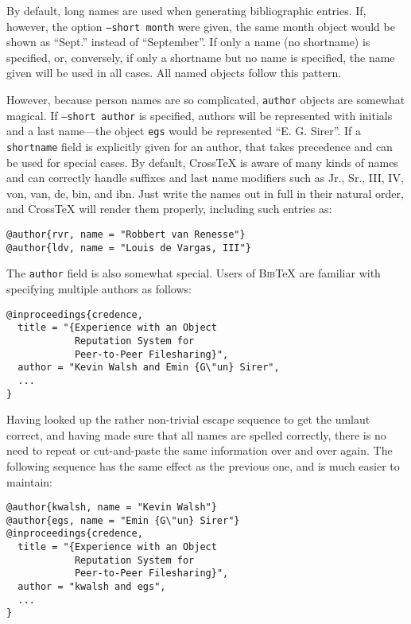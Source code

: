 \documentclass{article}
\newcommand{\XTeX}{Cross\TeX}
\newcommand{\BibTeX}{\textsc{Bib}\TeX}
\begin{document}
By default, long names are used when generating bibliographic entries. If, however, the option \texttt{--short month} were given, the same month object would be shown as ``Sept.'' instead of ``September''. If only a name (no shortname) is specified, or, conversely, if only a shortname but no name is specified, the name given will be used in all cases. All named objects follow this pattern.

However, because person names are so complicated, \texttt{author} objects are somewhat magical. If \texttt{--short author} is specified, authors will be represented with initials and a last name---the object \texttt{egs} would be represented ``E. G. Sirer''. If a \texttt{shortname} field is explicitly given for an author, that takes precedence and can be used for special cases. 
By default, \XTeX{} is aware of many kinds of names and can correctly handle suffixes and last name modifiers such as Jr., Sr., III, IV, von, van, de, bin, and ibn. Just write the names out in full in their natural order, and \XTeX{} will render them properly, including such entries as:

\begin{small}\begin{verbatim}
@author{rvr, name = "Robbert van Renesse"}
@author{ldv, name = "Louis de Vargas, III"}
\end{verbatim}\end{small}

The \texttt{author} field is also somewhat special. Users of \BibTeX{} are familiar with specifying multiple authors as follows:

\begin{small}\begin{verbatim}
@inproceedings{credence,
  title = "{Experience with an Object
            Reputation System for 
            Peer-to-Peer Filesharing}",
  author = "Kevin Walsh and Emin {G\"un} Sirer",
  ...
}
\end{verbatim}\end{small}

Having looked up the rather non-trivial escape sequence to get the umlaut 
correct, and having made sure that all names are spelled correctly, there
is no need to repeat or cut-and-paste the same information over and over
again. The following sequence has the same effect as the previous one, 
and is much easier to maintain:


\begin{small}\begin{verbatim}
@author{kwalsh, name = "Kevin Walsh"}
@author{egs, name = "Emin {G\"un} Sirer"}
@inproceedings{credence,
  title = "{Experience with an Object
            Reputation System for 
            Peer-to-Peer Filesharing}",
  author = "kwalsh and egs",
  ...
}
\end{verbatim}\end{small}
\end{document}
